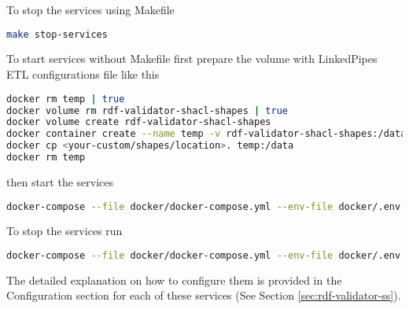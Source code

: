 To stop the services using Makefile

\begin{lstlisting}[language=bash,]
make stop-services
\end{lstlisting}

To start services without Makefile first prepare the volume with LinkedPipes ETL configurations file like this

\begin{lstlisting}[language=bash,]
docker rm temp | true
docker volume rm rdf-validator-shacl-shapes | true
docker volume create rdf-validator-shacl-shapes
docker container create --name temp -v rdf-validator-shacl-shapes:/data busybox
docker cp <your-custom/shapes/location>. temp:/data
docker rm temp
\end{lstlisting}

then start the services

\begin{lstlisting}[language=bash,]
docker-compose --file docker/docker-compose.yml --env-file docker/.env up -d
\end{lstlisting}

To stop the services run

\begin{lstlisting}[language=bash,]
docker-compose --file docker/docker-compose.yml --env-file docker/.env down
\end{lstlisting}

The detailed explanation on how to configure them is provided in the Configuration section for each of these services (See Section \ref{sec:rdf-validator-ss}).
